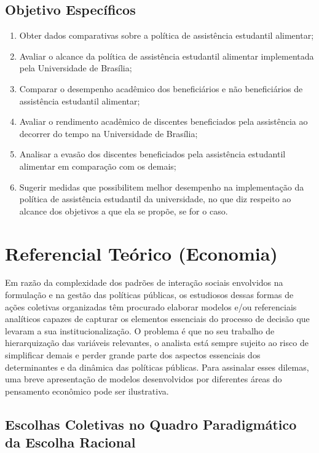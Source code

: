 \subsection{Objetivo Específicos}
\begin{enumerate}
	\item Obter dados comparativas sobre a política de assistência estudantil alimentar;
	\item Avaliar o alcance da política de assistência estudantil alimentar implementada pela Universidade de Brasília;
	\item Comparar o desempenho acadêmico dos beneficiários e não beneficiários de assistência estudantil alimentar;
	\item Avaliar o rendimento acadêmico de discentes beneficiados pela assistência ao decorrer do tempo na Universidade de Brasília; 
	\item Analisar a evasão dos discentes beneficiados pela assistência estudantil alimentar em comparação com os demais;
	\item Sugerir medidas que possibilitem melhor desempenho na implementação da política de assistência estudantil da universidade, no que diz respeito ao alcance dos objetivos a que ela se propõe, se for o caso.
\end{enumerate}%

\section{Referencial Teórico (Economia)}

Em razão da complexidade dos padrões de interação sociais envolvidos na formulação e na gestão das políticas públicas, os estudiosos dessas formas de ações coletivas organizadas têm procurado elaborar modelos e/ou referenciais analíticos capazes de capturar os elementos essenciais do processo de decisão que levaram a sua institucionalização. O problema é que no seu trabalho de hierarquização das variáveis relevantes, o analista está sempre sujeito ao risco de simplificar demais e perder grande parte dos aspectos essenciais dos determinantes e da dinâmica das políticas públicas. Para assinalar esses dilemas, uma breve apresentação de modelos desenvolvidos por diferentes áreas do pensamento econômico pode ser ilustrativa. 



\subsection{Escolhas Coletivas no Quadro Paradigmático da Escolha Racional}

